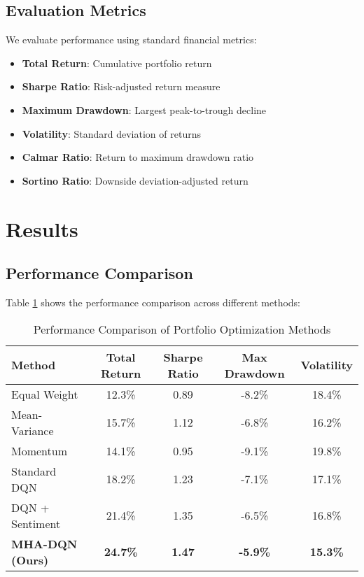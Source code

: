\documentclass[11pt,twocolumn]{article}
\theoremstyle{definition}
\begin{document}
\subsection{Evaluation Metrics}

We evaluate performance using standard financial metrics:

\begin{itemize}
\item \textbf{Total Return}: Cumulative portfolio return
\item \textbf{Sharpe Ratio}: Risk-adjusted return measure
\item \textbf{Maximum Drawdown}: Largest peak-to-trough decline
\item \textbf{Volatility}: Standard deviation of returns
\item \textbf{Calmar Ratio}: Return to maximum drawdown ratio
\item \textbf{Sortino Ratio}: Downside deviation-adjusted return
\end{itemize}

\section{Results}

\subsection{Performance Comparison}

Table \ref{tab:performance} shows the performance comparison across different methods:

\begin{table}[h]
\centering
\caption{Performance Comparison of Portfolio Optimization Methods}
\label{tab:performance}
\begin{tabular}{@{}lcccc@{}}
\toprule
Method & Total Return & Sharpe Ratio & Max Drawdown & Volatility \\
\midrule
Equal Weight & 12.3\% & 0.89 & -8.2\% & 18.4\% \\
Mean-Variance & 15.7\% & 1.12 & -6.8\% & 16.2\% \\
Momentum & 14.1\% & 0.95 & -9.1\% & 19.8\% \\
Standard DQN & 18.2\% & 1.23 & -7.1\% & 17.1\% \\
DQN + Sentiment & 21.4\% & 1.35 & -6.5\% & 16.8\% \\
\textbf{MHA-DQN (Ours)} & \textbf{24.7\%} & \textbf{1.47} & \textbf{-5.9\%} & \textbf{15.3\%} \\
\bottomrule
\end{tabular}
\end{table}
\end{document}
